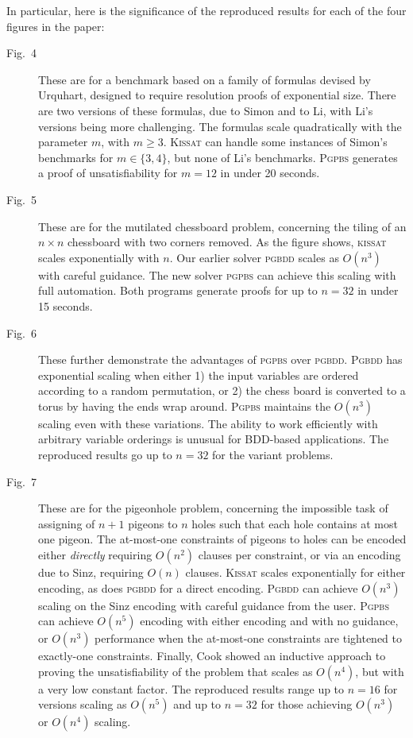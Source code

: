 \documentclass[runningheads]{llncs}
\newcommand{\pgbdd}{{\sffamily\scshape pgbdd}}
\newcommand{\Pgbdd}{{\sffamily\scshape  Pgbdd}}
\newcommand{\pgpbs}{{\sffamily\scshape  pgpbs}}
\newcommand{\Pgpbs}{{\sffamily\scshape  Pgpbs}}
\newcommand{\kissat}{{\sffamily\scshape kissat}}
\newcommand{\Kissat}{{\sffamily\scshape  Kissat}}
\begin{document}
In particular, here is the significance of the reproduced results for
each of the four figures in the paper:
\begin{description}
\item[Fig.~4] These are for a benchmark based on a family of formulas
  devised by Urquhart, designed to require resolution proofs of
  exponential size.  There are two versions of these formulas, due to
  Simon and to Li, with Li's versions being more challenging.  The
  formulas scale quadratically with the parameter $m$, with $m \geq
  3$.  \Kissat{} can handle some instances of Simon's benchmarks for
  $m \in \{3,4\}$, but none of Li's benchmarks.  \Pgpbs{} generates a
  proof of unsatisfiability for $m=12$ in under 20 seconds.

\item[Fig.~5] These are for the mutilated chessboard problem,
  concerning the tiling of an $n \times n$ chessboard with two corners
  removed.  As the figure shows, \kissat{} scales exponentially with
  $n$.  Our earlier solver \pgbdd{} scales as $O(n^3)$ with careful
  guidance.  The new solver \pgpbs{} can achieve this scaling with
  full automation. Both programs  generate proofs for up to
  $n=32$ in under 15 seconds.

\item[Fig.~6] These further demonstrate the advantages of \pgpbs{}
  over \pgbdd{}.  \Pgbdd{} has exponential scaling when either 1) the
  input variables are ordered according to a random permutation, or 2) the chess
  board is converted to a torus by having the ends wrap around.
  \Pgpbs{} maintains the $O(n^3)$ scaling even with these variations.
  The ability to work efficiently with arbitrary variable orderings is
  unusual for BDD-based applications.  The reproduced results go up to
  $n=32$ for the variant problems.

\item[Fig.~7] These are for the pigeonhole problem, concerning the
  impossible task of assigning of $n+1$ pigeons to $n$ holes such that
  each hole contains at most one pigeon.  The at-most-one constraints
  of pigeons to holes can be encoded either {\em directly} requiring
  $O(n^2)$ clauses per constraint, or via an encoding due to Sinz,
  requiring $O(n)$ clauses.  \Kissat{} scales exponentially for either
  encoding, as does \pgbdd{} for a direct encoding.  \Pgbdd{} can
  achieve $O(n^3)$ scaling on the Sinz encoding with careful guidance
  from the user.  \Pgpbs{} can achieve $O(n^5)$ encoding with either
  encoding and with no guidance, or $O(n^3)$ performance when the
  at-most-one constraints are tightened to exactly-one constraints.
  Finally, Cook showed an inductive approach to proving the
  unsatisfiability of the problem that scales as $O(n^4)$, but with a
  very low constant factor.  The reproduced results range up to $n=16$
  for versions scaling as $O(n^5)$ and up to $n=32$ for those achieving
  $O(n^3)$ or $O(n^4)$ scaling.
 
\end{description}
\end{document}

